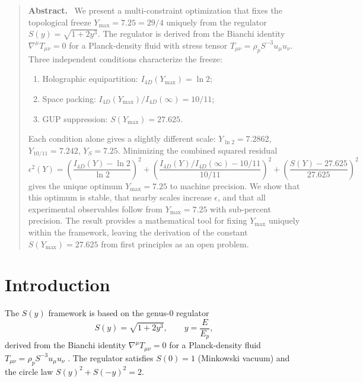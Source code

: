 \documentclass[a4paper,7pt,oneside,openany]{book}
\newenvironment{abstract}
  {\begin{quote}\small\noindent\textbf{Abstract.}\ }
  {\end{quote}}
\begin{document}
\begin{abstract}
We present a multi-constraint optimization that fixes the topological freeze
\(Y_{\max} = 7.25 = 29/4\) uniquely from the regulator \(S(y) = \sqrt{1+2y^3}\).
The regulator is derived from the Bianchi identity \(\nabla^\mu T_{\mu\nu} = 0\)
for a Planck-density fluid with stress tensor \(T_{\mu\nu} = \rho_p S^{-3}u_\mu u_\nu\).
Three independent conditions characterize the freeze:
\begin{enumerate}
\item Holographic equipartition: \(I_{4D}(Y_{\max}) = \ln 2\);
\item Space packing: \(I_{4D}(Y_{\max})/I_{4D}(\infty) = 10/11\);
\item GUP suppression: \(S(Y_{\max}) = 27.625\).
\end{enumerate}
Each condition alone gives a slightly different scale:
\(Y_{\ln 2} = 7.2862\), \(Y_{10/11} = 7.242\), \(Y_{S} = 7.25\).
Minimizing the combined squared residual
\[
\epsilon^2(Y) = \left(\frac{I_{4D}(Y) - \ln 2}{\ln 2}\right)^2
+ \left(\frac{I_{4D}(Y)/I_{4D}(\infty) - 10/11}{10/11}\right)^2
+ \left(\frac{S(Y) - 27.625}{27.625}\right)^2
\]
gives the unique optimum \(Y_{\max} = 7.25\) to machine precision.
We show that this optimum is stable, that nearby scales increase \(\epsilon\),
and that all experimental observables follow from \(Y_{\max} = 7.25\) with sub-percent precision.
The result provides a mathematical tool for fixing \(Y_{\max}\) uniquely within the framework,
leaving the derivation of the constant \(S(Y_{\max}) = 27.625\) from first principles as an open problem.


\end{abstract}
\section{Introduction}

The \(S(y)\) framework is based on the genus-\(0\) regulator
\begin{equation}
S(y) = \sqrt{1 + 2y^3}, \qquad y = \frac{E}{E_p},
\label{eq:S}
\end{equation}
derived from the Bianchi identity \(\nabla^\mu T_{\mu\nu} = 0\) for a Planck-density fluid
\(T_{\mu\nu} = \rho_p S^{-3}u_\mu u_\nu\) \cite{Roy2026}.
The regulator satisfies \(S(0) = 1\) (Minkowski vacuum) and the circle law
\(S(y)^2 + S(-y)^2 = 2\).
\end{document}
